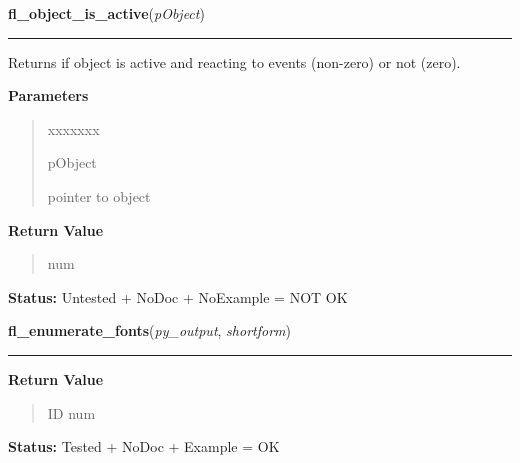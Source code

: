 \hspace{.8\funcindent}\begin{boxedminipage}{\funcwidth}

    \raggedright \textbf{fl\_object\_is\_active}(\textit{pObject})

    \vspace{-1.5ex}

    \rule{\textwidth}{0.5\fboxrule}
\setlength{\parskip}{2ex}
    Returns if object is active and reacting to events (non-zero) or not 
    (zero).

\setlength{\parskip}{1ex}
      \textbf{Parameters}
      \vspace{-1ex}

      \begin{quote}
        \begin{Ventry}{xxxxxxx}

          \item[pObject]

          pointer to object

        \end{Ventry}

      \end{quote}

      \textbf{Return Value}
    \vspace{-1ex}

      \begin{quote}
      num

      \end{quote}

\textbf{Status:} Untested + NoDoc + NoExample = NOT OK



    \end{boxedminipage}

    \label{xformslib:library:fl_enumerate_fonts}

    \vspace{0.5ex}

\hspace{.8\funcindent}\begin{boxedminipage}{\funcwidth}

    \raggedright \textbf{fl\_enumerate\_fonts}(\textit{py\_output}, \textit{shortform})

    \vspace{-1.5ex}

    \rule{\textwidth}{0.5\fboxrule}
\setlength{\parskip}{2ex}
\setlength{\parskip}{1ex}
      \textbf{Return Value}
    \vspace{-1ex}

      \begin{quote}
      ID num

      \end{quote}

\textbf{Status:} Tested + NoDoc + Example = OK



    \end{boxedminipage}

